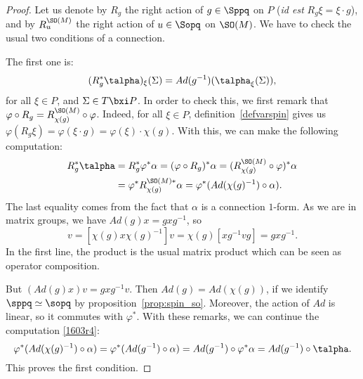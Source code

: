 \begin{proof}
Let us denote by $R_g$ the right action of $g\in\Sppq$ on $P$ (\emph{id est} $R_g\xi=\xi\cdot g$), and by $R_u^{\SO(M)}$ the right action of $u\in\Sopq$ on $\SO(M)$.
We  have to check the usual two conditions of a connection.

The first one is:
\[
            (R_g^*\talpha)_{\xi}(\Sigma)=Ad(g^{-1})(\talpha_{\xi}(\Sigma)),
\]
for all $\xi\in P$, and $\Sigma\in T\bxi P$. In order to check this, we first remark that $\varphi\circ R_g=R_{\chi(g)}^{\SO(M)}\circ\varphi$. Indeed, for all $\xi\in P$, definition~\ref{defvarspin} gives us $\varphi(R_g\xi)=\varphi(\xi\cdot g)=\varphi(\xi)\cdot\chi(g)$.  With this, we can make the following computation:
\begin{equation}\label{1603r4}
\begin{aligned}
R_g^*\talpha&=R_g^*\varphi^*\alpha=(\varphi\circ   R_g)^*\alpha	=(R_{\chi(g)}^{\SO(M)}\circ\varphi)^*\alpha\\
            &=\varphi^*R_{\chi(g)}^{\SO(M)*}\alpha=\varphi^*(Ad(\chi(g)^{-1})\circ\alpha).
\end{aligned}
\end{equation}
The last equality comes from the fact that $\alpha$ is a connection $1$-form. As we are in matrix groups, we have $Ad(g)x=gxg^{-1}$, so
\begin{equation}
   [Ad(\chi(g))x]v=[\chi(g) x \chi(g)^{-1}]v
                  =\chi(g)[xg^{-1} vg]
                  =gxg^{-1}.
\end{equation}
In the first line, the product is the usual matrix product which can be seen as operator composition.

But $(Ad(g)x)v=gxg^{-1} v$. Then $Ad(g)=Ad(\chi(g))$, if we identify $\sppq\simeq\sopq$ by proposition~\ref{prop:spin_so}. Moreover, the action of $Ad$ is linear, so it commutes with $\varphi^*$. With these remarks, we can continue the computation \eqref{1603r4}:
\begin{equation}
 \varphi^*(Ad(\chi(g)^{-1})\circ\alpha)=\varphi^*(Ad(g^{-1})\circ\alpha)
                                  =Ad(g^{-1})\circ\varphi^*\alpha
                                  =Ad(g^{-1})\circ\talpha.
\end{equation}
This proves the first condition.


\end{proof}

